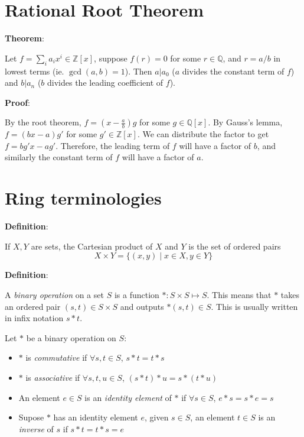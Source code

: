 \documentclass{article}
\begin{document}
\begin{multicols*}{2}
\section{Rational Root Theorem}

\textbf{Theorem}:

Let $f = \sum_{i}a_ix^i \in \mathbb{Z}[x]$, suppose $f(r) = 0$ for some $r \in \mathbb{Q}$, and $r = a/b$ in lowest terms (ie. $\gcd(a,b)=1$). Then $a|a_0$ ($a$ divides the constant term of $f$) and $b|a_n$ ($b$ divides the leading coefficient of $f$).

\textbf{Proof}:

By the root theorem, $f = (x - \frac{a}{b})g$ for some $g \in \mathbb{Q}[x]$. By Gauss's lemma, $f = (bx - a)g'$ for some $g' \in \mathbb{Z}[x]$. We can distribute the factor to get $f = bg'x - ag'$. Therefore, the leading term of $f$ will have a factor of $b$, and similarly the constant term of $f$ will have a factor of $a$.

\section{Ring terminologies}

\textbf{Definition}:

If $X, Y$ are sets, the Cartesian product of $X$ and $Y$ is the set of ordered pairs\[X \times Y = \{(x, y) \;|\;x\in X,y\in Y\}\]

\textbf{Definition}:

A \textit{binary operation} on a set $S$ is a function $* : S \times S \mapsto S$. This means that $*$ takes an ordered pair $(s, t) \in S \times S$ and outputs $*(s,t) \in S$. This is usually written in infix notation $s * t$.

Let $*$ be a binary operation on $S$:

\begin{itemize}
    \item $*$ is \textit{commutative} if $\forall s, t \in S$, $s * t = t * s$
    \item $*$ is \textit{associative} if $\forall s, t, u \in S$, $(s * t) * u= s * (t * u )$ 
    \item An element $e \in S$ is an \textit{identity element} of $*$ if $\forall s \in S$, $e*s=s*e=s$
    \item Supose $*$ has an identity element $e$, given $s \in S$, an element $t \in S$ is an \textit{inverse} of $s$ if $s*t = t*s = e$
\end{itemize}


\end{multicols*}
\end{document}
